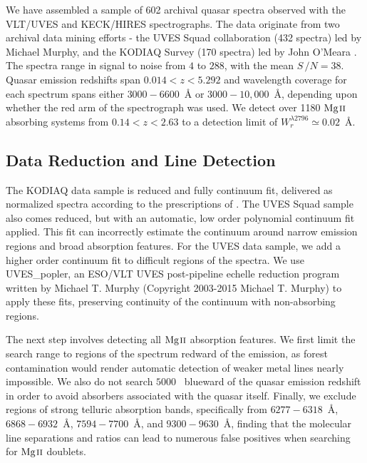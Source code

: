 \documentclass[iop,apj,numberedappendix,appendixfloats,twocolappendix]{emulateapj}
\begin{document}
We have assembled a sample of 602 archival quasar spectra observed with the VLT/UVES and KECK/HIRES spectrographs. The data originate from two archival data mining efforts - the UVES Squad collaboration (432 spectra) led by Michael Murphy, and the KODIAQ Survey (170 spectra) led by John O'Meara \citep{OMeara2015}. The spectra range in signal to noise from $4$ to $288$, with the mean $S\,/N = 38$. Quasar emission redshifts span $0.014 < z < 5.292$ and wavelength coverage for each spectrum spans either $3000 - 6600$~{\AA} or $3000 - 10,000$~{\AA}, depending upon whether the red arm of the spectrograph was used. We detect over 1180 ${\hbox{{\rm Mg}\kern 0.1em{\sc ii}}}$ absorbing systems from $0.14 < z < 2.63$ to a detection limit of $W_r^{\lambda2796} \simeq 0.02$~{\AA}.


\subsection{Data Reduction and Line Detection}
\label{sec:detection}

The KODIAQ data sample is reduced and fully continuum fit, delivered as normalized spectra according to the prescriptions of \cite{OMeara2015}. The UVES Squad sample also comes reduced, but with an automatic, low order polynomial continuum fit applied. This fit can incorrectly estimate the continuum around narrow emission regions and broad absorption features. For the UVES data sample, we add a higher order continuum fit to difficult regions of the spectra. We use UVES\_popler, an ESO/VLT UVES post-pipeline echelle reduction program written by Michael T. Murphy (Copyright 2003-2015 Michael T. Murphy) to apply these fits, preserving continuity of the continuum with non-absorbing regions. 

The next step involves detecting all ${\hbox{{\rm Mg}\kern 0.1em{\sc ii}}}$ absorption features. We first limit the search range to regions of the spectrum redward of the {\Lya} emission, as {\Lya} forest contamination would render automatic detection of weaker metal lines nearly impossible. We also do not search $5000$~{\kms} blueward of the quasar emission redshift in order to avoid absorbers associated with the quasar itself. Finally, we exclude regions of strong telluric absorption bands, specifically from $6277 - 6318$~{\AA}, $6868 - 6932$~{\AA}, $7594 - 7700$~{\AA}, and $9300 - 9630$~{\AA}, finding that the molecular line separations and ratios can lead to numerous false positives when searching for ${\hbox{{\rm Mg}\kern 0.1em{\sc ii}}}$ doublets. 
\end{document}
